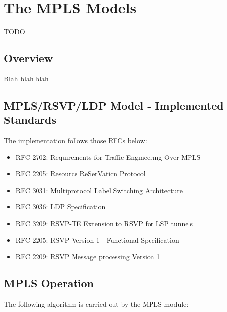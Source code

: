 \chapter{The MPLS Models}
\label{cha:mpls}


\ifdraft TODO
\section{Overview}

Blah blah blah
\fi


\section{MPLS/RSVP/LDP Model - Implemented Standards}

The implementation follows those RFCs below:

\begin{itemize}
  \item RFC 2702: Requirements for Traffic Engineering Over MPLS
  \item RFC 2205: Resource ReSerVation Protocol
  \item RFC 3031: Multiprotocol Label Switching Architecture
  \item RFC 3036: LDP Specification
  \item RFC 3209: RSVP-TE Extension to RSVP for LSP tunnels
  \item RFC 2205: RSVP Version 1 - Functional Specification
  \item RFC 2209: RSVP Message processing Version 1
\end{itemize}

\section{MPLS Operation}

The following algorithm is carried out by the MPLS module:

